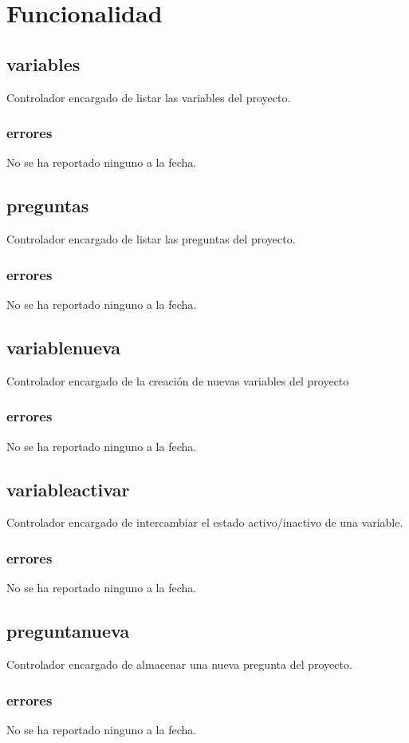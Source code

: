 \documentclass[10pt,a4paper]{book}
\begin{document}
	\section{Funcionalidad}

	\subsection{variables}
	Controlador encargado de listar las variables del proyecto.
	\subsubsection{errores}
	No se ha reportado ninguno a la fecha.
	
	\subsection{preguntas}
	Controlador encargado de listar las preguntas del proyecto.
	\subsubsection{errores}
	No se ha reportado ninguno a la fecha.
	
	\subsection{variablenueva}
	Controlador encargado de la creación de nuevas variables del proyecto
	\subsubsection{errores}
	No se ha reportado ninguno a la fecha.
	
	\subsection{variableactivar}
	Controlador encargado de intercambiar el estado activo/inactivo de una variable.
	\subsubsection{errores}
	No se ha reportado ninguno a la fecha.
	
	\subsection{preguntanueva}
	Controlador encargado de almacenar una nueva pregunta del proyecto.
	\subsubsection{errores}
	No se ha reportado ninguno a la fecha.
	
\end{document}
